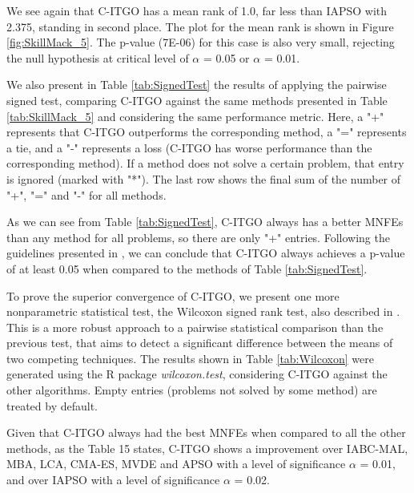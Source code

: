 We see again that C-ITGO has a mean rank of 1.0, far less than IAPSO with 2.375, standing in second place. The plot for the mean rank is shown in Figure \ref{fig:SkillMack_5}. The p-value (7E-06) for this case is also very small, rejecting the null hypothesis at critical level of $\alpha$ = 0.05 or $\alpha$ = 0.01.


We also present in Table \ref{tab:SignedTest} the results of applying the pairwise signed test, comparing C-ITGO against the same methods presented in Table \ref{tab:SkillMack_5} and considering the same performance metric. Here, a "+" represents that C-ITGO outperforms the corresponding method, a "=" represents a tie, and a "-" represents a loss (C-ITGO has worse performance than the corresponding method). If a method does not solve a certain problem, that entry is ignored (marked with "*"). The last row shows the final sum of the number of "+", "=" and "-" for all methods.

As we can see from Table \ref{tab:SignedTest}, C-ITGO always has a better MNFEs than any method for all problems, so there are only "+" entries. Following the guidelines presented in \cite{Friedman}, we can conclude that C-ITGO always achieves a p-value of at least 0.05 when compared to the methods of Table \ref{tab:SignedTest}.




To prove the superior convergence of C-ITGO, we present one more nonparametric statistical test, the Wilcoxon signed rank test, also described in \cite{Friedman}. This is a more robust approach to a pairwise statistical comparison than the previous test, that aims to detect a significant difference between the means of two competing techniques. The results shown in Table \ref{tab:Wilcoxon} were generated using the R package \textit{wilcoxon.test}, considering C-ITGO against the other algorithms. Empty entries (problems not solved by some method) are treated by default.




Given that C-ITGO always had the best MNFEs when compared to all the other methods, as the Table 15 states, C-ITGO shows a improvement over IABC-MAL, MBA, LCA, CMA-ES, MVDE and APSO  with a level of significance $\alpha$ = 0.01, and over IAPSO with a level of significance $\alpha$ = 0.02.